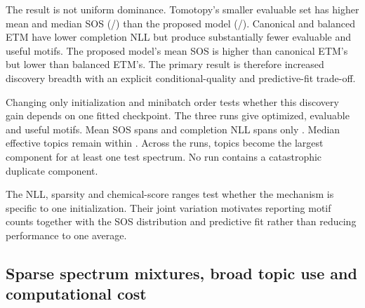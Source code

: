\documentclass[10pt,a4paper]{article}
\begin{document}
The result is not uniform dominance. Tomotopy's smaller evaluable set has higher
mean and median SOS (\TomotopyMeanSOS{}/\TomotopyMedianSOS{}) than the proposed
model (\ContextualMeanSOS{}/\ContextualMedianSOS{}). Canonical and balanced ETM have
lower completion NLL but produce substantially fewer evaluable and useful
motifs. The proposed model's mean SOS is higher than canonical ETM's but lower
than balanced ETM's. The primary result is therefore increased discovery
breadth with an explicit conditional-quality and predictive-fit trade-off.

Changing only initialization and minibatch order tests whether this discovery
gain depends on one fitted checkpoint. The three runs give
\StabilityOptimizedRange{} optimized, \StabilityEvaluableRange{} evaluable and
\StabilityUsefulRange{} useful motifs. Mean SOS spans
\StabilitySOSRange{} and completion NLL spans only
\StabilityNLLRange{}. Median effective topics remain within
\StabilityMedianEffectiveRange{}. Across the runs,
\StabilityUniqueRange{} topics become the largest component for at least one
test spectrum. No run contains a catastrophic duplicate component.

\begin{table}[H]
\centering
\scriptsize
\caption{Same-split training-seed stability. SOS is the substructure overlap
score, NLL is completion negative log-likelihood and median eff. is the median
entropy-effective topic count; unique counts distinct document winners. The
final row reports the descriptive sample mean and standard deviation for three
initializations, not population uncertainty.}
\label{tab:stability}
\end{table}

The NLL, sparsity and chemical-score ranges test whether the mechanism is
specific to one initialization. Their joint variation motivates reporting motif
counts together with the SOS distribution and predictive fit rather than
reducing performance to one average.

\subsection{Sparse spectrum mixtures, broad topic use and computational cost}
\end{document}
